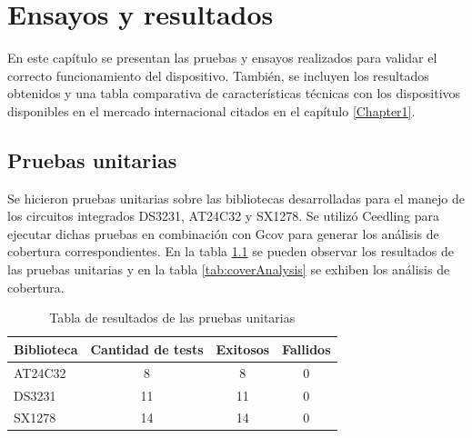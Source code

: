 
\chapter{Ensayos y resultados} %

\label{Chapter4} %



En este capítulo se presentan las pruebas y ensayos realizados para validar el correcto funcionamiento del dispositivo. También, se incluyen los resultados obtenidos y una tabla comparativa de características técnicas con los dispositivos disponibles en el mercado internacional citados en el capítulo \ref{Chapter1}.


\section{Pruebas unitarias}
\label{sec:pruebasU}

Se hicieron pruebas unitarias sobre las bibliotecas desarrolladas para el manejo de los circuitos integrados DS3231, AT24C32 y SX1278. Se utilizó Ceedling para ejecutar dichas pruebas en combinación con Gcov para generar los análisis de cobertura correspondientes. En la tabla \ref{tab:resultsCeedling} se pueden observar los resultados de las pruebas unitarias y en la tabla \ref{tab:coverAnalysis} se exhiben los análisis de cobertura.

\begin{table}[h]
	\centering
	\caption[Pruebas unitarias]{Tabla de resultados de las pruebas unitarias}
	\begin{tabular}{l c c c}    
		\toprule
		\textbf{Biblioteca} & \textbf{Cantidad de tests} & \textbf{Exitosos} & \textbf{Fallidos}  \\
		\midrule
		AT24C32 & 8	& 8 & 0 \\		
		DS3231 & 11 & 11 & 0 \\
		SX1278 & 14 & 14 & 0 \\
		\bottomrule
		\hline
	\end{tabular}
	\label{tab:resultsCeedling}
\end{table}

